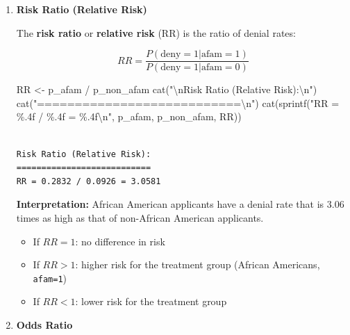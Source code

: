 \documentclass[
  12pt,
  a4paper,
]{scrbook}
\newenvironment{Shaded}{\begin{snugshade}}{\end{snugshade}}
\newcommand{\FunctionTok}[1]{\textcolor[rgb]{0.28,0.35,0.67}{#1}}
\newcommand{\NormalTok}[1]{\textcolor[rgb]{0.00,0.23,0.31}{#1}}
\newcommand{\OtherTok}[1]{\textcolor[rgb]{0.00,0.23,0.31}{#1}}
\newcommand{\SpecialCharTok}[1]{\textcolor[rgb]{0.37,0.37,0.37}{#1}}
\newcommand{\StringTok}[1]{\textcolor[rgb]{0.13,0.47,0.30}{#1}}
\providecommand{\tightlist}{%
  \setlength{\itemsep}{0pt}\setlength{\parskip}{0pt}}
\renewcommand{\tightlist}{\setlength{\itemsep}{0.5\baselineskip}\setlength{\parskip}{0.2\baselineskip}}
\theoremstyle{plain}
\theoremstyle{definition}
\theoremstyle{remark}
\begin{document}
\begin{enumerate}
  \begin{itemize}
  \tightlist
  \item
    If \(ER = 0\): no difference in risk between groups
  \item
    If \(ER > 0\): higher risk for the {treatment group} (African
    Americans, \texttt{afam=1})
  \item
    If \(ER < 0\): lower risk for the treatment group
  \end{itemize}
\item
  \textbf{Risk Ratio (Relative Risk)}

  The \textbf{risk ratio} or \textbf{relative risk} (RR) is the ratio of
  denial rates:

  \[
  RR = \frac{P(\text{deny}=1|\text{afam}=1)}{P(\text{deny}=1|\text{afam}=0)}
  \]

\begin{Shaded}
\begin{Highlighting}[]
\NormalTok{RR }\OtherTok{\textless{}{-}}\NormalTok{ p\_afam }\SpecialCharTok{/}\NormalTok{ p\_non\_afam}
\FunctionTok{cat}\NormalTok{(}\StringTok{"}\SpecialCharTok{\textbackslash{}n}\StringTok{Risk Ratio (Relative Risk):}\SpecialCharTok{\textbackslash{}n}\StringTok{"}\NormalTok{)}
\FunctionTok{cat}\NormalTok{(}\StringTok{"===========================}\SpecialCharTok{\textbackslash{}n}\StringTok{"}\NormalTok{)}
\FunctionTok{cat}\NormalTok{(}\FunctionTok{sprintf}\NormalTok{(}\StringTok{"RR = \%.4f / \%.4f = \%.4f}\SpecialCharTok{\textbackslash{}n}\StringTok{"}\NormalTok{, p\_afam, p\_non\_afam, RR))}
\end{Highlighting}
\end{Shaded}

\begin{verbatim}

Risk Ratio (Relative Risk):
===========================
RR = 0.2832 / 0.0926 = 3.0581
\end{verbatim}

  \textbf{Interpretation:} African American applicants have a denial
  rate that is 3.06 times as high as that of non-African American
  applicants.

  \begin{itemize}
  \tightlist
  \item
    If \(RR = 1\): no difference in risk
  \item
    If \(RR > 1\): higher risk for the treatment group (African
    Americans, \texttt{afam=1})
  \item
    If \(RR < 1\): lower risk for the treatment group
  \end{itemize}
\item
  \textbf{Odds Ratio}


\end{enumerate}
\end{document}
